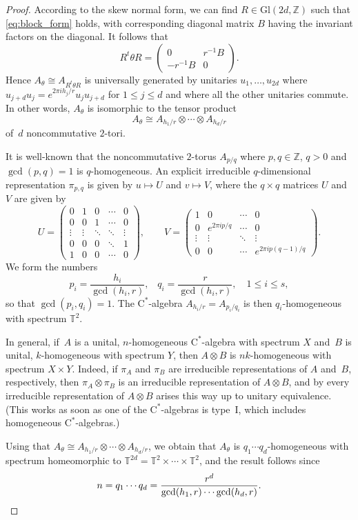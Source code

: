 \documentclass[reqno, a4paper]{amsart}
\numberwithin{equation}{section}
\newcommand{\Z}{\mathbb{Z}}   %
\newcommand{\T}{\mathbb{T}}   %
\newcommand{\ca}{$\mathrm{C}^*$-algebra}
\begin{document}
\begin{proof}
According to the skew normal form, we can find $R \in \mathrm{Gl}(2d,\Z)$ such that \eqref{eq:block_form} holds, with corresponding diagonal matrix $B$ having the invariant factors on the diagonal. 
It follows that
\[
R^t\theta R = \begin{pmatrix} 0 & r^{-1}B \\ -r^{-1}B & 0 \end{pmatrix}. 
\]
Hence $A_{\theta} \cong A_{R^t \theta R}$ is universally generated by unitaries $u_1, \ldots, u_{2d}$ where $u_{j+d} u_j = e^{2\pi i h_j/r} u_j u_{j+d}$ for $1 \leq j \leq d$ and where all the other unitaries commute. 
In other words, $A_{\theta}$ is isomorphic to the tensor product
\[ 
A_{\theta} \cong A_{h_1/r} \otimes \cdots \otimes A_{h_{d}/r} 
\]
of~$d$ noncommutative $2$-tori.

It is well-known that the noncommutative $2$-torus $A_{p/q}$ where $p,q \in \Z$, $q > 0$ and $\gcd(p,q) = 1$ is $q$-homogeneous. 
An explicit irreducible $q$-dimensional representation $\pi_{p,q}$ is given by $u \mapsto U$ and $v \mapsto V$, where the $q \times q$ matrices $U$ and $V$ are given by
\[ 
U = \begin{pmatrix} 0 & 1 & 0 & \cdots & 0 \\ 0 & 0 & 1 & \cdots & 0 \\ \vdots & \vdots  & \ddots & \ddots & \vdots \\ 0 & 0 & 0& \ddots & 1 \\ 1 & 0 & 0 & \cdots & 0 \end{pmatrix}, \qquad V = \begin{pmatrix} 1 & 0 & \cdots & 0 \\ 0 & e^{2\pi i p/q} & \cdots & 0 \\ \vdots & \vdots & \ddots & \vdots \\ 0 & 0 & \cdots & e^{2\pi i p (q-1)/q} \end{pmatrix}. 
\]
We form the numbers
\[ 
p_i = \frac{h_i}{\gcd(h_i,r)}, \;\;\; q_i = \frac{r}{\gcd(h_i,r)}, \quad 1 \leq i \leq s, 
\]
so that $\gcd(p_i,q_i) = 1$. 
The \ca{} $A_{h_i/r} = A_{p_i/q_i}$ is then $q_i$-homogeneous with spectrum $\T^2$.

In general, if~$A$ is a unital, $n$-homogeneous \ca{} with spectrum $X$ and~$B$ is unital, $k$-homogeneous with spectrum $Y$, then $A \otimes B$ is $nk$-homogeneous with spectrum $X \times Y$.
Indeed, if $\pi_A$ and $\pi_B$ are irreducible representations of $A$ and~$B$, respectively, then $\pi_A\otimes\pi_B$ is an irreducible representation of $A \otimes B$, and by \cite[IV.3.4.25]{Bla06OpAlgs} every irreducible representation of $A \otimes B$ arises this way up to unitary equivalence. 
(This works as soon as one of the \ca{s} is type~I, which includes homogeneous \ca{s}.)

Using that $A_{\theta} \cong A_{h_1/r} \otimes \cdots \otimes A_{h_{d}/r}$, we obtain that $A_\theta$ is $q_1 \cdots q_d$-homogeneous with spectrum homeomorphic to $\T^{2d} = \T^2 \times \cdots \times \T^2$, and the result follows since
\[ 
n = q_1 \cdots q_d = \frac{r^d}{\gcd(h_1,r) \cdots \gcd(h_d,r)}. \qedhere
\]
\end{proof}
\end{document}
